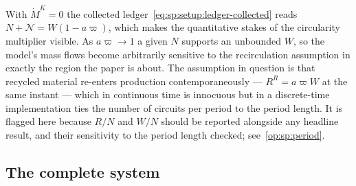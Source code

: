  With $\dot M^K=0$ the collected
ledger~\eqref{eq:sp:setup:ledger-collected} reads $N+\mathcal N=W\left(1-a\varpi\right)$, which makes
the quantitative stakes of the circularity multiplier visible. As $a\varpi\to1$ a given $N$ supports an
unbounded $W$, so the model's mass flows become arbitrarily sensitive to the recirculation assumption in
exactly the region the paper is about. The assumption in question is that recycled material re-enters
production contemporaneously --- $R^R=a\varpi W$ at the same instant --- which in continuous time is
innocuous but in a discrete-time implementation ties the number of circuits per period to the period
length. It is flagged here because $R/N$ and $W/N$ should be reported alongside any headline result,
and their sensitivity to the period length checked; see~\ref{op:sp:period}.


\subsection{The complete system}\label{sec:sp:A:system}

